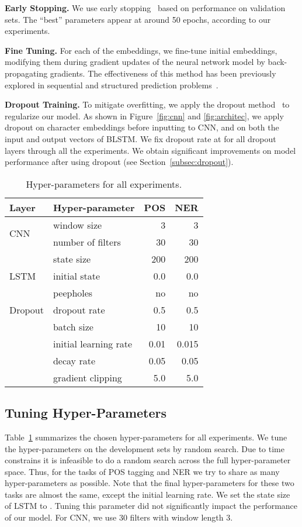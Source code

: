 \documentclass[11pt]{article}
\begin{document}
\noindent
\textbf{Early Stopping.} We use early stopping~\cite{giles2001,graves2013speech} based on performance on validation sets. The ``best'' parameters appear at around 50 epochs, according to our experiments.

\noindent
\textbf{Fine Tuning.} For each of the embeddings, we fine-tune initial embeddings, modifying them during gradient updates of the neural network model by back-propagating gradients. The effectiveness of this method has been previously explored in sequential and structured prediction problems~\cite{collobert2011natural,peng-dredze:2015:EMNLP}.

\noindent
\textbf{Dropout Training.} To mitigate overfitting, we apply the dropout method~\cite{srivastava2014dropout} to regularize our model. As shown in Figure~\ref{fig:cnn} and \ref{fig:architec}, we apply dropout on character embeddings before inputting to CNN, and on both the input and output vectors of BLSTM. We fix dropout rate at  for all dropout layers through all the experiments. We obtain significant improvements on model performance after using dropout (see Section~\ref{subsec:dropout}).

\begin{table}
\centering
\begin{tabular}[t]{l|l|r|r}
\hline
\textbf{Layer} & \textbf{Hyper-parameter} & \textbf{POS} & \textbf{NER} \\
\hline
\multirow{2}{*}{CNN} & window size & 3 & 3 \\
 & number of filters & 30 & 30 \\
\hline
\multirow{3}{*}{LSTM} & state size & 200 & 200 \\
 & initial state & 0.0 & 0.0 \\
 & peepholes & no & no \\
\hline
Dropout & dropout rate & 0.5 & 0.5 \\
\hline
 & batch size & 10 & 10 \\
 & initial learning rate & 0.01 & 0.015 \\
 & decay rate & 0.05 & 0.05 \\
 & gradient clipping & 5.0 & 5.0 \\
\hline
\end{tabular}
\caption{Hyper-parameters for all experiments.}
\label{tab:hyper-params}
\end{table}

\subsection{Tuning Hyper-Parameters}
\label{subsec:hyper-params}
Table~\ref{tab:hyper-params} summarizes the chosen hyper-parameters for all experiments. We tune the hyper-parameters on the development sets by random search. Due to time constrains it is infeasible to do a random search across the full hyper-parameter space. Thus, for the tasks of POS tagging and NER we try to share as many hyper-parameters as possible. Note that the final hyper-parameters for these two tasks are almost the same, except the initial learning rate. We set the state size of LSTM to . Tuning this parameter did not significantly impact the performance of our model. For CNN, we use 30 filters with window length 3. 
\end{document}
